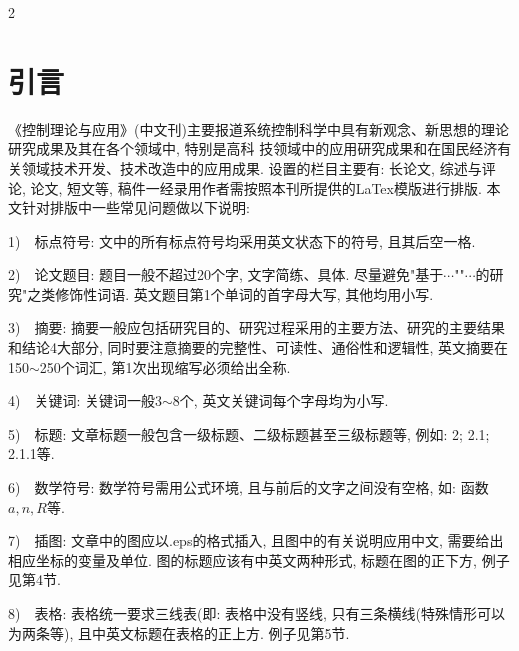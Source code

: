 \renewcommand\refname{\normalsize{{\CJKfamily{hei}参考文献}}}
\setlength{\oddsidemargin}{-.5cm}  %
 \setlength{\textwidth}{171mm}
\vspace{10pt}
\begin{multicols}{2}
\fontsize{10.5bp}{12.9bp}\selectfont
\section{引言}
《控制理论与应用》(中文刊)主要报道系统控制科学中具有新观念、\!\!新思想的理论研究成果及其在各个领域中,
特别是高科
技领域中的应用研究成果和在国民经济有关领域技术开发、\!\!技术改造中的应用成果.
设置的栏目主要有: 长论文, 综述与评论, 论文, 短文等,
稿件一经录用作者需按照本刊所提供的LaTex模版进行排版.
本文针对排版中一些常见问题做以下说明:

1)~~标点符号: 文中的所有标点符号均采用英文状态下的符号,
且其后空一格.

2)~~论文题目: 题目一般不超过20个字, 文字简练、具体.
尽量避免"基于$\cdots$""$\cdots$的研究"之类修饰性词语.
英文题目第1个单词的首字母大写, 其他均用小写.

3)~~摘要:
摘要一般应包括研究目的、\!\!研究过程采用的主要方法、\!\!研究的主要结果和结论4大部分,
同时要注意摘要的完整性、\!\!可读性、\!\!通俗性和逻辑性,
英文摘要在150$\sim$250个词汇, 第1次出现缩写必须给出全称.


4)~~关键词: 关键词一般3$\sim$8个, 英文关键词每个字母均为小写.

5)~~标题: 文章标题一般包含一级标题、\!\!二级标题甚至三级标题等,
例如: 2; 2.1; 2.1.1等.

6)~~数学符号: 数学符号需用公式环境, 且与前后的文字之间没有空格, 如:
函数$a, n, R$等.

7)~~插图: 文章中的图应以.eps的格式插入, 且图中的有关说明应用中文,
需要给出相应坐标的变量及单位. 图的标题应该有中英文两种形式,
标题在图的正下方, 例子见第4节.

8)~~表格: 表格统一要求三线表(即: 表格中没有竖线,
只有三条横线(特殊情形可以为两条等), 且中英文标题在表格的正上方.
例子见第5节.


\end{multicols}

